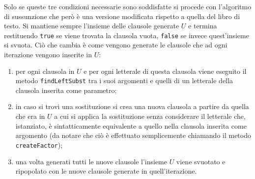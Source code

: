 \documentclass[a4paper,11pt]{article}
\begin{document}
Solo se queste tre condizioni necessarie sono soddisfatte si procede con l'algoritmo di sussunzione che però è una versione modificata rispetto a quella del libro di testo. Si mantiene sempre l'insieme delle clausole generate $U$ e termina restituendo \texttt{true} se viene trovata la clausola vuota, \texttt{false} se invece quest'insieme si svuota. Ciò che cambia è come vengono generate le clausole che ad ogni iterazione vengono inserite in $U$:
\begin{enumerate}
\item per ogni clausola in $U$ e per ogni letterale di questa clausola viene eseguito il metodo \texttt{findLeftSubst} tra i suoi argomenti e quelli di un letterale della clausola inserita come parametro;
\item in caso si trovi una sostituzione si crea una nuova clausola a partire da quella che era in $U$ a cui si applica la sostituzione senza considerare il letterale che, istanziato, è sintatticamente equivalente a quello nella clausola inserita come argomento (da notare che ciò è effettuato semplicemente chiamando il metodo \texttt{createFactor});
\item una volta generati tutti le nuove clausole l'insieme $U$ viene svuotato e ripopolato con le nuove clausole generate in quell'iterazione.
\end{enumerate}
\end{document}
